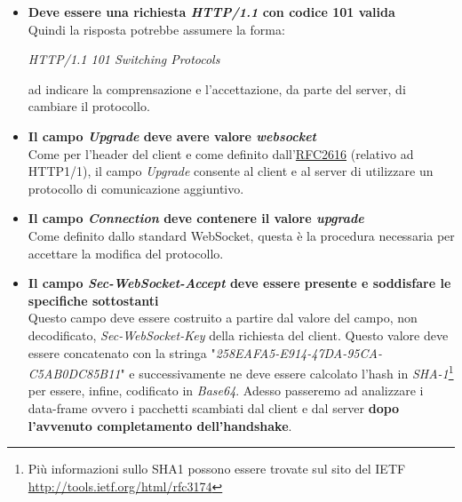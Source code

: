 \documentclass[
  oneside,
  11pt, a4paper,
  footinclude=true,
  headinclude=true,
  cleardoublepage=empty
]{scrbook}
\begin{document}
\begin{itemize}
  \item \textbf{Deve essere una richiesta \textit{HTTP/1.1} con codice 101 valida}\\
  Quindi la risposta potrebbe assumere la forma:
  \begin{center}\textit{HTTP/1.1 101 Switching Protocols}\end{center}
  ad indicare la comprensazione e l'accettazione, da parte del server, di cambiare il protocollo.
  \item \textbf{Il campo \textit{Upgrade} deve avere valore \textit{websocket}}\\
  Come per l'header del client e come definito dall'\href{http://tools.ietf.org/html/rfc2616#page-144}{RFC2616} (relativo ad HTTP1/1), il campo \textit{Upgrade} consente al client e al server di utilizzare un protocollo di comunicazione aggiuntivo.
  
  \item \textbf{Il campo \textit{Connection} deve contenere il valore \textit{upgrade}}\\
  Come definito dallo standard WebSocket, questa è la procedura necessaria per accettare la modifica del protocollo.
  
  \item \textbf{Il campo \textit{Sec-WebSocket-Accept} deve essere presente e soddisfare le specifiche sottostanti}\\
  Questo campo deve essere costruito a partire dal valore del campo, non decodificato, \textit{Sec-WebSocket-Key} della richiesta del client.
  Questo valore deve essere concatenato con la stringa "\textit{258EAFA5-E914-47DA-95CA-C5AB0DC85B11}" e successivamente ne deve essere calcolato l'hash in \textit{SHA-1}\footnote{Più informazioni sullo SHA1 possono essere trovate sul sito del IETF \href{http://tools.ietf.org/html/rfc3174}{http://tools.ietf.org/html/rfc3174}} per essere, infine, codificato in \textit{Base64}.
  Adesso passeremo ad analizzare i data-frame ovvero i pacchetti scambiati dal client e dal server \textbf{dopo l'avvenuto completamento dell'handshake}.
\end{itemize}
\end{document}
